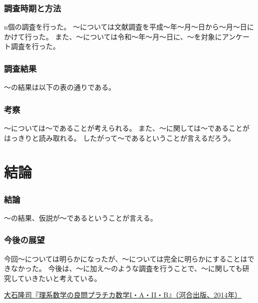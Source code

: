 \documentclass[10.5pt]{jsarticle}
\begin{document}
\section{調査時期と方法}
n個の調査を行った。
〜については文献調査を平成〜年〜月〜日から〜月〜日にかけて行った。
また、〜については令和〜年〜月〜日に、〜を対象にアンケート調査を行った。

\section{調査結果}
〜の結果は以下の表の通りである。

\section{考察}
〜については〜であることが考えられる。
また、〜に関しては〜であることがはっきりと読み取れる。
したがって〜であるということが言えるだろう。

\part{結論}
\section{結論}
〜の結果、仮説が〜であるということが言える。
\section{今後の展望}
今回〜については明らかになったが、〜については完全に明らかにすることはできなかった。
今後は、〜に加え〜のような調査を行うことで、〜に関しても研究していきたいと考えている。

\begin{thebibliography}{2501}
 \url{大石隆司『理系数学の良問プラチカ数学I・A・II・B』（河合出版、2014年）}
\end{thebibliography}
\end{document}
